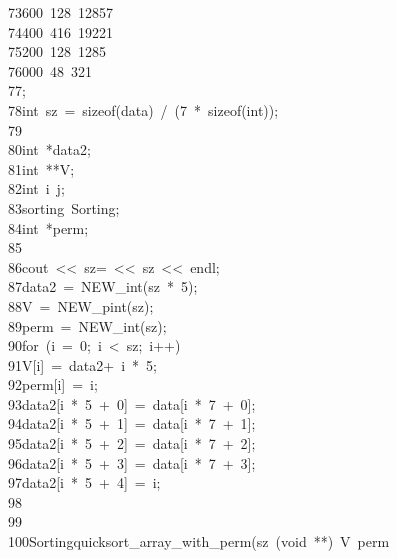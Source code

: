 \begin{tabbing}
73\>\>\>600\ 128\ 12857\\[0pt]
74\>\>\>400\ 416\ 19221\\[0pt]
75\>\>\>200\ 128\ 1285\\[0pt]
76\>\>\>000\ 48\ 321\\[0pt]
77\>\>;\\[0pt]
78\>\>int\ sz\ =\ sizeof(data)\ /\ (7\ *\ sizeof(int));\\[0pt]
79\>\\[0pt]
80\>\>int\ *data2;\\[0pt]
81\>\>int\ **V;\\[0pt]
82\>\>int\ i\ j;\\[0pt]
83\>\>sorting\ Sorting;\\[0pt]
84\>\>int\ *perm;\\[0pt]
85\>\\[0pt]
86\>\>cout\ <<\ sz=\ <<\ sz\ <<\ endl;\\[0pt]
87\>\>data2\ =\ NEW\_int(sz\ *\ 5);\\[0pt]
88\>\>V\ =\ NEW\_pint(sz);\\[0pt]
89\>\>perm\ =\ NEW\_int(sz);\\[0pt]
90\>\>for\ (i\ =\ 0;\ i\ <\ sz;\ i++)\ \\[0pt]
91\>\>\>V[i]\ =\ data2+\ i\ *\ 5;\\[0pt]
92\>\>\>perm[i]\ =\ i;\\[0pt]
93\>\>\>data2[i\ *\ 5\ +\ 0]\ =\ data[i\ *\ 7\ +\ 0];\\[0pt]
94\>\>\>data2[i\ *\ 5\ +\ 1]\ =\ data[i\ *\ 7\ +\ 1];\\[0pt]
95\>\>\>data2[i\ *\ 5\ +\ 2]\ =\ data[i\ *\ 7\ +\ 2];\\[0pt]
96\>\>\>data2[i\ *\ 5\ +\ 3]\ =\ data[i\ *\ 7\ +\ 3];\\[0pt]
97\>\>\>data2[i\ *\ 5\ +\ 4]\ =\ i;\\[0pt]
98\>\>\\[0pt]
99\>\\[0pt]
100\>\>Sortingquicksort\_array\_with\_perm(sz\ (void\ **)\ V\ perm\\[0pt]

\end{tabbing}
